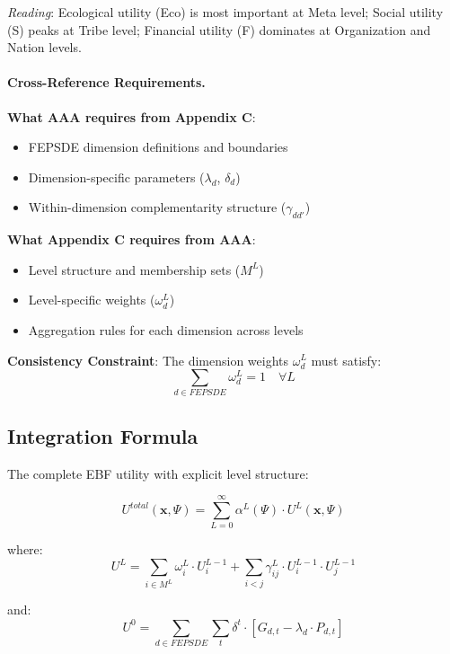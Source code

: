 \textit{Reading}: Ecological utility (Eco) is most important at Meta level; Social utility (S) 
peaks at Tribe level; Financial utility (F) dominates at Organization and Nation levels.

\paragraph{Cross-Reference Requirements.}

\begin{tcolorbox}[colback=yellow!5!white, colframe=yellow!75!black, title=Required Coordination: AAA $\leftrightarrow$ C]
\textbf{What AAA requires from Appendix C}:
\begin{itemize}[nosep]
\item FEPSDE dimension definitions and boundaries
\item Dimension-specific parameters ($\lambda_d$, $\delta_d$)
\item Within-dimension complementarity structure ($\gamma_{dd'}$)
\end{itemize}

\textbf{What Appendix C requires from AAA}:
\begin{itemize}[nosep]
\item Level structure and membership sets ($M^L$)
\item Level-specific weights ($\omega^L_d$)
\item Aggregation rules for each dimension across levels
\end{itemize}

\textbf{Consistency Constraint}:
The dimension weights $\omega^L_d$ must satisfy:
\begin{equation}
\sum_{d \in FEPSDE} \omega^L_d = 1 \quad \forall L
\end{equation}
\end{tcolorbox}

\subsection{Integration Formula}

The complete EBF utility with explicit level structure:

\begin{tcolorbox}[colback=blue!5!white, colframe=blue!75!black, title=Complete Multi-Level Utility]
\begin{equation}
\boxed{
U^{total}(\mathbf{x}, \Psi) = \sum_{L=0}^{\infty} \alpha^L(\Psi) \cdot U^L(\mathbf{x}, \Psi)
}
\end{equation}

where:
\begin{equation}
U^L = \sum_{i \in M^L} \omega^L_i \cdot U^{L-1}_i + \sum_{i < j} \gamma^L_{ij} \cdot U^{L-1}_i \cdot U^{L-1}_j
\end{equation}

and:
\begin{equation}
U^0 = \sum_{d \in FEPSDE} \sum_{t} \delta^t \cdot \left[ G_{d,t} - \lambda_d \cdot P_{d,t} \right]
\end{equation}
\end{tcolorbox}

